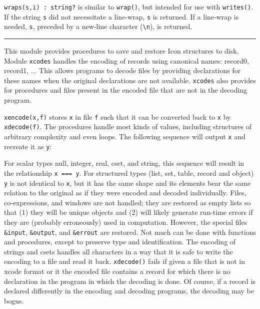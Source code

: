\texttt{wraps(s,i) : string?} is similar to \texttt{wrap()}, but
intended for use with \texttt{writes()}. If the string \texttt{s} did
not necessitate a line-wrap, \texttt{s} is returned. If a line-wrap is
needed, \texttt{s}, preceded by a new-line character
(\texttt{{\textquotedbl}{\textbackslash}n{\textquotedbl}}), is
returned.

\vspace{0.25cm}\hrule{}

This module provides procedures to save and restore Icon structures to
disk. Module \texttt{xcodes} handles the encoding of
records using canonical names: record0, record1, ... This allows
programs to decode files by providing declarations for these names when
the original declarations are not available. \texttt{xcodes} also
provides for procedures and files present in the encoded file that are
not in the decoding program.

\texttt{xencode(x,f)} stores \texttt{x} in file
\texttt{f} such that it can be converted back to \texttt{x} by
\texttt{xdecode(f)}. The procedures handle most kinds of values,
including structures of arbitrary complexity and even loops. The
following sequence will output \texttt{x} and recreate it as
\texttt{y}:


\noindent For {\textquotedbl}scalar{\textquotedbl} types null, integer,
real, cset, and string, this sequence will result in the relationship
\texttt{x === y}. For structured types (list, set, table, record and object)
\texttt{y} is not identical to \texttt{x}, but it has the same
{\textquotedbl}shape{\textquotedbl} and its elements bear the same
relation to the original as if they were encoded and decoded
individually. Files, co-expressions, and windows are not handled;
they are restored as empty
lists so that (1) they will be unique objects and (2) will likely
generate run-time errors if they are (probably
erroneously) used in computation. However, the special files
\texttt{\&input}, \texttt{\&output}, and \texttt{\&errout} are
restored. Not much can be done with functions and procedures, except to
preserve type and identification. The encoding of strings and csets
handles all characters in a way that it is safe to write the encoding
to a file and read it back. \texttt{xdecode()} fails if given a file
that is not in xcode format or it the encoded file contains a record
for which there is no declaration in the program in which the decoding
is done. Of course, if a record is declared differently in the encoding
and decoding programs, the decoding may be bogus.

